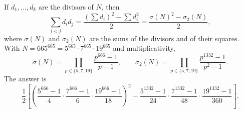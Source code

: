 If $d_1,\dots,d_k$ are the divisors of $N$, then
\[\sum_{i<j}d_id_j=\dfrac{\left(\sum d_i\right)^2-\sum d_i^2}{2}=\dfrac{\sigma(N)^2-\sigma_2(N)}{2},\]
where $\sigma(N)$ and $\sigma_2(N)$ are the sums of the divisors and of their squares. With $N=665^{665}=5^{665}\cdot7^{665}\cdot19^{665}$ and multiplicativity,
\[\sigma(N)=\prod_{p\in\{5,7,19\}}\dfrac{p^{666}-1}{p-1},\qquad\sigma_2(N)=\prod_{p\in\{5,7,19\}}\dfrac{p^{1332}-1}{p^2-1}.\]
The answer is
\[\boxed{\dfrac12\left[\left(\dfrac{5^{666}-1}{4}\cdot\dfrac{7^{666}-1}{6}\cdot\dfrac{19^{666}-1}{18}\right)^2-\dfrac{5^{1332}-1}{24}\cdot\dfrac{7^{1332}-1}{48}\cdot\dfrac{19^{1332}-1}{360}\right]}.\]

